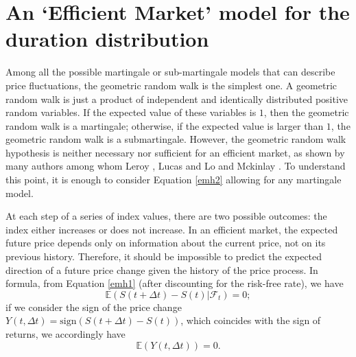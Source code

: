 \documentclass[a4paper]{jpconf}
\begin{document}
\section{An `Efficient Market' model for the duration distribution}
\label{model}
Among all the possible martingale or sub-martingale models that can describe price fluctuations, the geometric random walk is the simplest one. A geometric random walk is just a product of independent and identically distributed positive random variables. If the expected value of these variables is $1$, then the geometric random walk is a martingale; otherwise, if the expected value is larger than $1$, the geometric random walk is a submartingale. However, the geometric random walk hypothesis is neither necessary nor sufficient for an efficient market, as shown by many authors among whom Leroy \cite{leroy}, Lucas \cite{lucas} and Lo and Mckinlay \cite{lo}. To understand this point, it is enough to consider Equation \eqref{emh2} allowing for any martingale model.

At each step of a series of index values, there are two possible outcomes: the index either increases or does not increase. In an efficient market, the expected future price depends only on information about the current price, not on its previous history. Therefore, it should be impossible to predict the expected direction of a future price change given the history of the price process. In formula, from Equation \eqref{emh1} (after discounting for the risk-free rate), we have\begin{equation}
\label{expectedincrement}
\mathbb{E}(S(t+\Delta t) - S(t)|\mathcal{F}_t)= 0;
\end{equation}
if we consider the sign of the price change $Y(t,\Delta t)=\mathrm{sign}(S(t+\Delta t)-S(t))$, which coincides with the sign of returns, we accordingly have
\begin{equation}
\label{expectedsign}
\mathbb{E}(Y(t,\Delta t))=0.
\end{equation}
\end{document}
